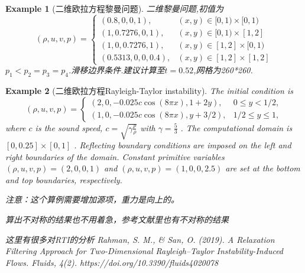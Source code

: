 \documentclass{article}
\newtheorem{example}{Example}
\numberwithin{equation}{section}    %
\begin{document}
\begin{example}[二维欧拉方程黎曼问题]{}{}
    二维黎曼问题\cite{RN13},初值为
    \begin{equation}
        (\rho, u, v, p)=\begin{cases}
            (0.8,0,0,1),      & (x, y) \in[0,1) \times[0,1) \\
            (1,0.7276,0,1),   & (x, y) \in[0,1) \times[1,2] \\
            (1,0,0.7276,1),   & (x, y) \in[1,2] \times[0,1) \\
            (0.5313,0,0,0.4), & (x, y) \in[1,2] \times[1,2]
        \end{cases}
    \end{equation}
    $p_1<p_2=p_3=p_4$.滑移边界条件.建议计算至$t=0.52$,网格为260*260.

\end{example}
\begin{example}[二维欧拉方程Rayleigh-Taylor instability]
    \cite{liang2024new}
    The initial condition is
    \begin{equation}
        (\rho, u, v, p)=\left\{\begin{array}{ll}
            (2,0,-0.025 c \cos (8 \pi x), 1+2 y),   & 0 \leq y<1 / 2,      \\
            (1,0,-0.025 c \cos (8 \pi x), y+3 / 2), & 1 / 2 \leq y \leq 1,
        \end{array}\right.
    \end{equation}
    where  $c$  is the sound speed,  $c=\sqrt{\gamma \frac{p}{\rho}}$  with  $\gamma=\frac{5}{3}$ . The computational domain is  $[0,0.25] \times[0,1]$ . Reflecting boundary conditions are imposed on the left and right boundaries of the domain. Constant primitive variables  $(\rho, u, v, p)=(2,0,0,1)$  and  $(\rho, u, v, p)=(1,0,0,2.5)$  are set at the bottom and top boundaries, respectively.

    注意：这个算例需要增加源项，重力是向上的。




    算出不对称的结果也不用着急，参考文献里也有不对称的结果~\cite{shi2003resolution}


    这里有很多对RTI的分析
    Rahman, S. M., \& San, O. (2019). A Relaxation Filtering Approach for Two-Dimensional Rayleigh–Taylor Instability-Induced Flows. Fluids, 4(2). https://doi.org/10.3390/fluids4020078 

\end{example}



\clearpage


\end{document}

